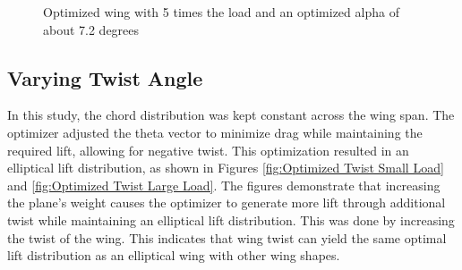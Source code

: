 \documentclass{article}
\begin{document}
\begin{figure}[h]
\begin{minipage}[b]{0.45\textwidth}
\caption{Optimized wing with 5 times the load and an optimized alpha of about 7.2 degrees}
\label{fig:Optimized Alpha Large Load}
\end{minipage}
\end{figure}

\subsection{Varying Twist Angle}
In this study, the chord distribution was kept constant across the wing span. The optimizer adjusted the theta vector to minimize drag while maintaining the required lift, allowing for negative twist. This optimization resulted in an elliptical lift distribution, as shown in Figures \ref{fig:Optimized Twist Small Load} and \ref{fig:Optimized Twist Large Load}.  The figures demonstrate that increasing the plane's weight causes the optimizer to generate more lift through additional twist while maintaining an elliptical lift distribution. This was done by increasing the twist of the wing. This indicates that wing twist can yield the same optimal lift distribution as an elliptical wing with other wing shapes. 
\end{document}
